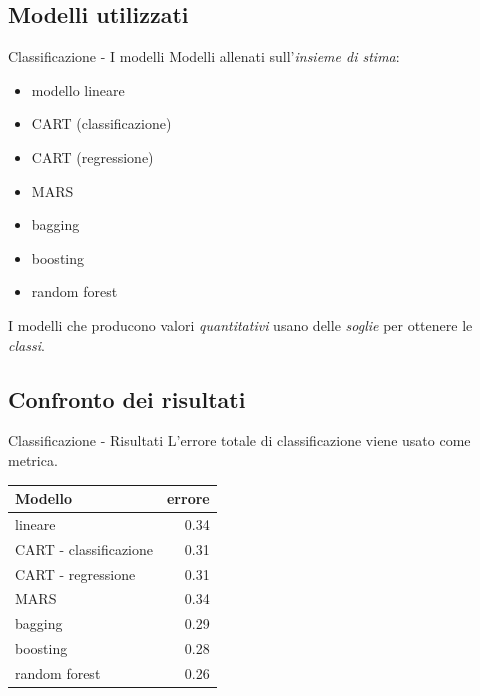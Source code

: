\documentclass{beamer}
\begin{document}
\subsection{Modelli utilizzati}
\begin{frame}{Classificazione - I modelli}
Modelli allenati sull'\emph{insieme di stima}:
\begin{itemize}
  \item modello lineare
  \item CART (classificazione)
  \item CART (regressione)
  \item MARS
  \item bagging
  \item boosting
  \item random forest
\end{itemize}
I modelli che producono valori \emph{quantitativi} usano delle \emph{soglie}
per ottenere le \emph{classi}.
\end{frame}

\subsection{Confronto dei risultati}
\begin{frame}{Classificazione - Risultati}
L'errore totale di classificazione viene usato come metrica.
\begin{table}
  \centering
  \begin{tabular}{|| l | r ||}
    \hline
    Modello                & errore \\
    \hline
    lineare                & 0.34   \\
    CART - classificazione & 0.31   \\
    CART - regressione     & 0.31   \\
    MARS                   & 0.34   \\
    bagging                & 0.29   \\
    boosting               & 0.28   \\
    random forest          & 0.26   \\
    \hline
  \end{tabular}
\end{table}
\end{frame}
\end{document}
